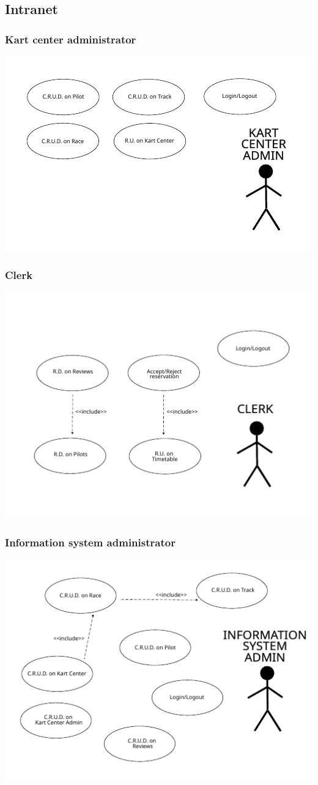 \documentclass{beamer}
\begin{document}
\subsection*{Intranet}

\begin{frame}
    \frametitle{Kart center administrator}
    \centering
    \includegraphics[width=0.9\linewidth]{drawings/uc-kcadmin.pdf}
\end{frame}

\begin{frame}
    \frametitle{Clerk}
    \centering
    \includegraphics[width=0.9\linewidth]{drawings/uc-clerk.pdf}
\end{frame}

\begin{frame}
    \frametitle{Information system administrator}
    \centering
    \includegraphics[width=0.9\linewidth]{drawings/uc-isadmin.pdf}
\end{frame}
\end{document}
